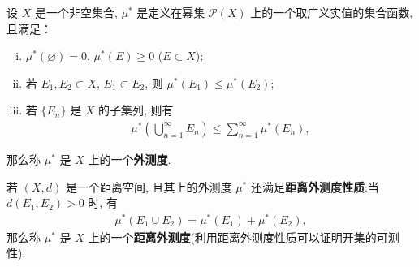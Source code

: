 \documentclass[../../main.tex]{subfiles}
\begin{document}
\begin{definition}[集合上的外测度]
设 \(X\) 是一个非空集合, \(\mu^*\) 是定义在幂集 \(\mathcal{P}(X)\) 上的一个取广义实值的集合函数, 且满足：
\begin{enumerate}[(i)]
\item \(\mu^*(\varnothing)=0\), \(\mu^*(E) \geqslant  0\) (\(E \subset X\));
\item 若 \(E_1, E_2 \subset X\), \(E_1 \subset E_2\), 则 \(\mu^*(E_1) \leqslant  \mu^*(E_2)\);
\item 若 \(\{E_n\}\) 是 \(X\) 的子集列, 则有
\begin{align*}
\mu^*\left( \bigcup_{n = 1}^{\infty} E_n \right) \leqslant  \sum_{n = 1}^{\infty} \mu^*(E_n),
\end{align*}
\end{enumerate}
那么称 \(\mu^*\) 是 \(X\) 上的一个\textbf{外测度}.

若 \((X, d)\) 是一个距离空间, 且其上的外测度 \(\mu^*\) 还满足\textbf{距离外测度性质}:当 \(d(E_1, E_2)>0\) 时, 有
\begin{align*}
\mu^*(E_1 \cup E_2) = \mu^*(E_1) + \mu^*(E_2),
\end{align*}
那么称 \(\mu^*\) 是 \(X\) 上的一个\textbf{距离外测度}(利用距离外测度性质可以证明开集的可测性). 
\end{definition}
\end{document}
